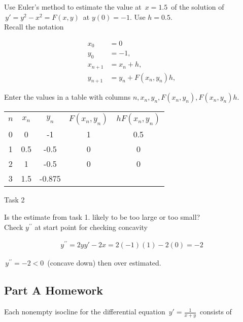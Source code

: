 Use Euler's method to estimate the value at $\, x=1.5 \,$ of the solution of
$\, y' = y^2 − x^2 = F(x,y)\,$  at $y(0)=−1$. Use $h=0.5$.\\
Recall the notation

\begin{align*}
  x_0 &= 0 \\
  y_0 &= -1, \\
  x_{n+1} &= x_n + h,  \\
  y_{n+1} &= y_n + F(x_n, y_n)h, 
\end{align*}


Enter the values in a table with columns
$n, x_ n, y_ n, F(x_ n,y_ n) , F(x_ n,y_ n)h$.

\begin{table}[ht!]
  \centering
  \begin{tabular}{ccccc}
    $n$ & $x_n$ & $y_n$ & $F(x_n, y_n)$ & $h F(x_n, y_n)$ \\
    0  & 0     & -1     &  1   &  0.5    \\
    1  & 0.5   & -0.5   & 0 &  0   \\
    2  & 1   &  -0.5  & 0 &  0 \\
    3  & 1.5   & -0.875 & &   
  \end{tabular}
\end{table}

\begin{problem}
  Task 2
\end{problem}

Is the estimate from task 1. likely to be too large or too small? \\

Check $y^{\prime \prime}$ at start point for checking concavity

\begin{align*}
  y^{\prime \prime} = 2 y y' - 2 x = 2(-1)(1)  -2(0) = - 2 
\end{align*}

$\, y^{\prime \prime} = -2 < 0 \,$ (concave down) then over estimated.

\clearpage

\subsection{Part A Homework}

\begin{problem}
  Each nonempty isocline for the differential equation
  $ \, y' = \frac{1}{x + y} \,$ consists of 
\end{problem}

